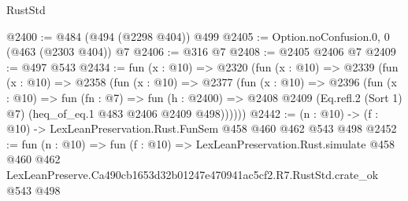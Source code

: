 \begin{lexlean}{RustStd}
\begin{coremodule}
@2400 := @484 (@494 (@2298 @404)) @499
@2405 := Option.noConfusion.{0, 0} (@463 (@2303 @404)) @7
@2406 := @316 @7
@2408 := @2405 @2406 @7
@2409 := @497 @543
@2434 := fun (x : @10) =>
  @2320
    (fun (x : @10) =>
    @2339
      (fun (x : @10) =>
      @2358
        (fun (x : @10) =>
        @2377
          (fun (x : @10) =>
          @2396
            (fun (x : @10) =>
            fun (fn : @7) =>
            fun (h : @2400) =>
            @2408 @2409 (Eq.refl.{2} (Sort 1) @7) (heq_of_eq.{1} @483 @2406 @2409 @498))))))
@2442 := (n : @10) -> (f : @10) -> LexLeanPreservation.Rust.FunSem @458 @460 @462 @543 @498
@2452 := fun (n : @10) =>
  fun (f : @10) =>
  LexLeanPreservation.Rust.simulate
    @458
    @460
    @462
    LexLeanPreserve.Ca490cb1653d32b01247e470941ac5cf2.R7.RustStd.crate_ok
    @543
    @498
\end{coremodule}
\end{lexlean}
